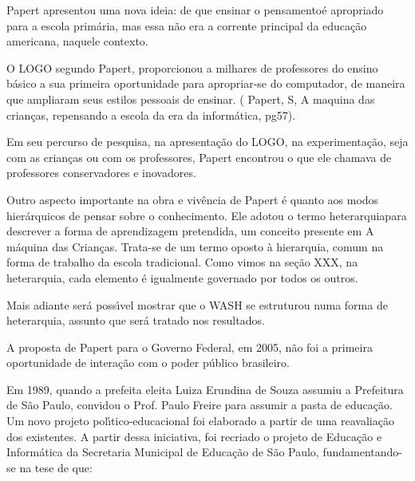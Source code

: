 \documentclass[
12pt,		%
openright,	%
twoside,  %
a4paper,			%
chapter=TITLE,		%
english,			%
french,				%
spanish,			%
brazil				%
]{USPSC-classe/USPSC}
\begin{document}
Papert apresentou uma nova ideia: de que \textquotedbl ensinar o pensamento\textquotedbl   \'e apropriado para a escola prim\'aria, mas essa n\~ao era a corrente principal da educa\c{c}\~ao americana, naquele contexto.




O LOGO segundo Papert,  proporcionou a milhares de professores do ensino b\'asico a sua primeira oportunidade para apropriar-se do computador, de maneira que ampliaram seus estilos pessoais de ensinar. ( Papert, S, \textquotedbl A maquina das crian\c{c}as, repensando a escola da era da inform\'atica\textquotedbl  , pg57).




Em seu percurso de pesquisa, na apresenta\c{c}\~ao do LOGO, na experimenta\c{c}\~ao, seja com as crian\c{c}as ou com os professores, Papert encontrou o que ele chamava de \textquotedbl professores conservadores e  inovadores\textquotedbl  [XXX].




Outro aspecto importante na obra e viv\^encia de Papert \'e quanto aos modos hier\'arquicos de pensar sobre o conhecimento.  Ele adotou o termo  \textquotedbl heterarquia\textquotedbl  para descrever a forma de aprendizagem pretendida, um conceito presente em  \textquotedbl A m\'aquina das Crian\c{c}as\textquotedbl . Trata-se de  um termo oposto \`a hierarquia, comum na forma de trabalho da escola tradicional. Como vimos na se\c{c}\~ao XXX, na heterarquia, cada elemento \'e igualmente governado por todos os outros.




Mais adiante ser\'a poss\'{\i}vel mostrar que o WASH se estruturou numa forma de heterarquia, assunto que ser\'a tratado nos resultados.




A proposta de Papert para o Governo Federal, em 2005, n\~ao foi a primeira oportunidade de intera\c{c}\~ao com o poder p\'ublico brasileiro.




Em 1989, quando a prefeita eleita Luiza Erundina de Souza assumiu a Prefeitura de S\~ao Paulo, convidou o Prof. Paulo Freire para assumir a pasta de educa\c{c}\~ao. Um novo projeto pol\'{\i}tico-educacional foi elaborado a partir de uma reavalia\c{c}\~ao dos existentes. A partir dessa iniciativa, foi recriado o projeto de Educa\c{c}\~ao e Inform\'atica da Secretaria Municipal de Educa\c{c}\~ao de S\~ao Paulo, fundamentando-se na tese de que:
\end{document}
